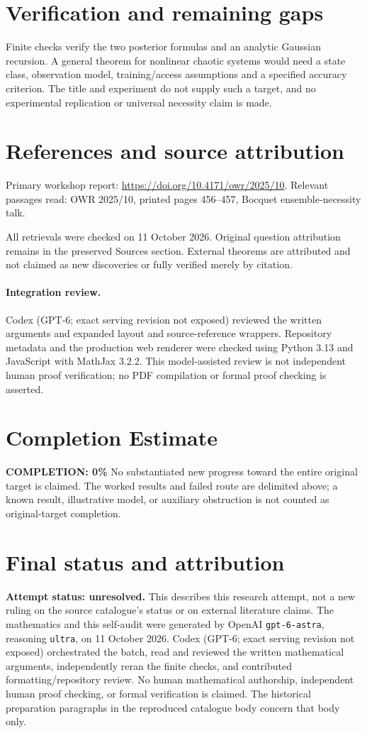 \documentclass[11pt]{article}
\begin{document}
\section{Verification and remaining gaps}
Finite checks verify the two posterior formulas and an analytic Gaussian recursion. A general theorem for nonlinear chaotic systems would need a state class, observation model, training/access assumptions and a specified accuracy criterion. The title and experiment do not supply such a target, and no experimental replication or universal necessity claim is made.

\section{References and source attribution}
Primary workshop report: \url{https://doi.org/10.4171/owr/2025/10}. Relevant passages read: OWR 2025/10, printed pages 456--457, Bocquet ensemble-necessity talk.

All retrievals were checked on 11 October 2026. Original question attribution remains in the preserved Sources section. External theorems are attributed and not claimed as new discoveries or fully verified merely by citation.


\paragraph{Integration review.} Codex (GPT-6; exact serving revision not exposed) reviewed the written arguments and expanded layout and source-reference wrappers. Repository metadata and the production web renderer were checked using Python 3.13 and JavaScript with MathJax 3.2.2. This model-assisted review is not independent human proof verification; no PDF compilation or formal proof checking is asserted.

\section{Completion Estimate}
\noindent\textbf{COMPLETION: 0\%}
No substantiated new progress toward the entire original target is claimed. The worked results and failed route are delimited above; a known result, illustrative model, or auxiliary obstruction is not counted as original-target completion.

\section{Final status and attribution}
\textbf{Attempt status: unresolved.} This describes this research attempt, not a new ruling on the source catalogue's status or on external literature claims.
The mathematics and this self-audit were generated by OpenAI \texttt{gpt-6-astra}, reasoning \texttt{ultra}, on 11 October 2026. Codex (GPT-6; exact serving revision not exposed) orchestrated the batch, read and reviewed the written mathematical arguments, independently reran the finite checks, and contributed formatting/repository review. No human mathematical authorship, independent human proof checking, or formal verification is claimed. The historical preparation paragraphs in the reproduced catalogue body concern that body only.
\end{document}
